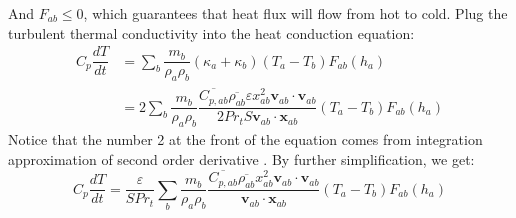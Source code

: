 \documentclass[journal abbreviation, manuscript]{copernicus}
\begin{document}
And  $F_{ab} \leq 0$, which guarantees that heat flux will flow from hot to cold.
Plug the turbulent thermal conductivity into the heat conduction equation:
\begin{equation}
\begin{split}
C_p \dfrac{dT}{dt} 
& = \sum_b \dfrac{m_b}{\rho_a \rho_b} (\kappa_a + \kappa_b) (T_a - T_b) F_{ab} (h_a) \\
 &= 2 \sum_b \dfrac{m_b}{\rho_a \rho_b} \dfrac{\overline{C_{p,ab}} \overline{\rho_{ab}} \varepsilon x_{ab}^2 \textbf{v}_{ab} \cdot \textbf{v}_{ab}}{2 Pr_t  S \textbf{v}_{ab} \cdot \textbf{x}_{ab} } (T_a - T_b) F_{ab} (h_a)
\end{split}
\end{equation}
Notice that the number 2 at the front of the equation comes from integration approximation of second order derivative \citep {cleary1999conduction}. By further simplification, we get:
\begin{equation}
C_p \dfrac{dT}{dt}
 =\dfrac{\varepsilon}{S  Pr_t}  \sum_b \dfrac{m_b}{\rho_a \rho_b} \dfrac{\overline{C_{p,ab}} \overline{\rho_{ab}} x_{ab}^2 \textbf{v}_{ab} \cdot \textbf{v}_{ab}}{\textbf{v}_{ab} \cdot \textbf{x}_{ab}} (T_a - T_b) F_{ab} (h_a)
\end{equation}
\end{document}
